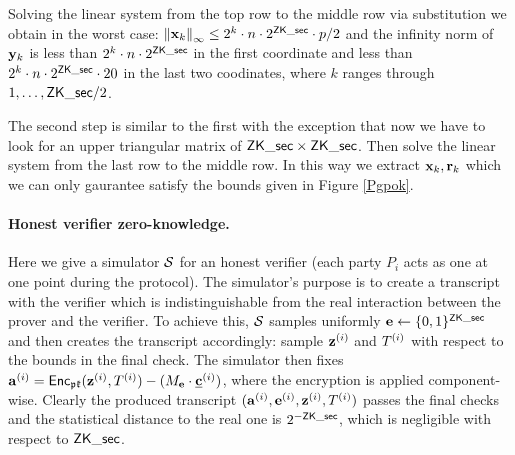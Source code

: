 Solving the linear system from the top row to the middle row via substitution we obtain in the worst case: 
${\Vert \mathbf{x}_k \Vert}_\infty \leq 2^k \cdot n \cdot 2^{\mathsf{ZK\_sec}} \cdot p/2$ and the infinity norm of
$\mathbf{y}_k$ is less than $2^k \cdot n \cdot 2^{\mathsf{ZK\_sec}}$ in the first coordinate
and less than $2^k \cdot n \cdot 2^{\mathsf{ZK\_sec}} \cdot 20$ in the last two coodinates,
where $k$ ranges through $1, \dots, \mathsf{ZK\_sec}/2$. 

The second step is similar to the first with the exception that now we have to look for an 
upper triangular matrix of $\mathsf{ZK\_sec} \times \mathsf{ZK\_sec}$. 
Then solve the linear system from the last row to the middle row. 
In this way we extract $\mathbf{x}_k, \mathbf{r}_k$ which we can only gaurantee satisfy the 
bounds given in Figure \ref{Pgpok}.

\paragraph{Honest verifier zero-knowledge.} 
Here we give a simulator $\mathcal{S}$ for an honest verifier (each party $P_i$ acts as one at one point during the protocol). 
The simulator's purpose is to create a transcript with the verifier which is indistinguishable from the real 
interaction between the prover and the verifier. 
To achieve this, $\mathcal{S}$ samples uniformly $\mathbf{e} \leftarrow \{0,1\}^{\mathsf{ZK\_sec}}$ and then creates the transcript accordingly: 
sample $\mathbf{z}^{(i)}$ and $T^{(i)}$ with respect to the bounds in the final check.
The simulator then fixes $\mathbf{a}^{(i)} = \mathsf{Enc}_{\mathfrak{pk}}(\mathbf{z}^{(i)}, T^{(i)}) - (M_{\mathbf{e}} \cdot \underline{\mathbf{c}}^{(i)})$, where the encryption is applied component-wise. Clearly the produced transcript $(\mathbf{a}^{(i)}, \mathbf{e}^{(i)}, \mathbf{z}^{(i)}, T^{(i)})$ passes the final checks and the statistical distance to the real one is $2^{-\mathsf{ZK\_sec}}$, which is negligible with respect to $\mathsf{ZK\_sec}$.

